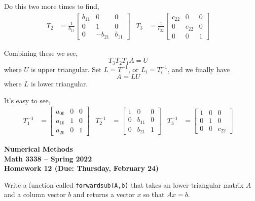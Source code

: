 \documentclass[11pt,letterpaper]{article}
\newcommand{\semester}{Spring 2022}
\newcommand{\due}{Thursday, February 24}
\begin{document}
Do this two more times to find,
\begin{align*}
T_2 &= \frac{1}{b_{11}}\begin{bmatrix}
b_{11} & 0 & 0 \\
0 & 1 & 0 \\
0 & -b_{21} & b_{11}
\end{bmatrix}
&
T_3 &= \frac{1}{c_{22}}\begin{bmatrix}
c_{22} & 0 & 0 \\
0 & c_{22} & 0 \\
0 & 0 & 1
\end{bmatrix}
\end{align*}

Combining these we see,
\[
T_3T_2T_1A = U
\]
where $U$ is upper triangular. Set $L = T^{-1}$, or $L_i = T_i^{-1}$, and we finally have
\[
 A = LU
\]
where $L$ is lower triangular.

It's easy to see,
\begin{align*}
T_1^{-1} &= \begin{bmatrix}
a_{00} & 0 & 0 \\
a_{10} & 1 & 0 \\
a_{20} & 0 & 1
\end{bmatrix}
&
T_2^{-1} &= \begin{bmatrix}
1 & 0 & 0 \\
0 & b_{11} & 0 \\
0 & b_{21} & 1
\end{bmatrix}
&
T_3^{-1} &= \begin{bmatrix}
1 & 0 & 0 \\
0 & 1 & 0 \\
0 & 0 & c_{22}
\end{bmatrix}
\end{align*}




\newpage

\begin{center}
{\huge{\bf  Numerical Methods}} \\[1.5ex]
{\bf Math 3338 -- \semester}\\[1.5ex]
{\Large{\bf Homework 12 (Due: \due)}}\\
\end{center}
\vspace{2mm}


\begin{problem}
 Write a function called \texttt{forwardsub(A,b)} that takes an lower-triangular matrix $A$ and
a column vector $b$ and returns a vector $x$ so that $Ax=b$. 
\end{problem}
\end{document}

